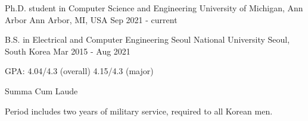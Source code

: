 

\begin{cventries}

  \cventry
    {Ph.D. student in Computer Science and Engineering}
    {University of Michigan, Ann Arbor} %
    {Ann Arbor, MI, USA} %
    {Sep 2021 - current} %
    {
    }
    
  \cventry
    {B.S. in Electrical and Computer Engineering}
    {Seoul National University} %
    {Seoul, South Korea} %
    {Mar 2015 - Aug 2021} %
    {
      \begin{cvitems} %
        \item {GPA: 4.04/4.3 (overall) 4.15/4.3 (major)}
        \item {Summa Cum Laude}
        \item {Period includes two years of military service, required to all Korean men.}
      \end{cvitems}
    }
    
\end{cventries}
